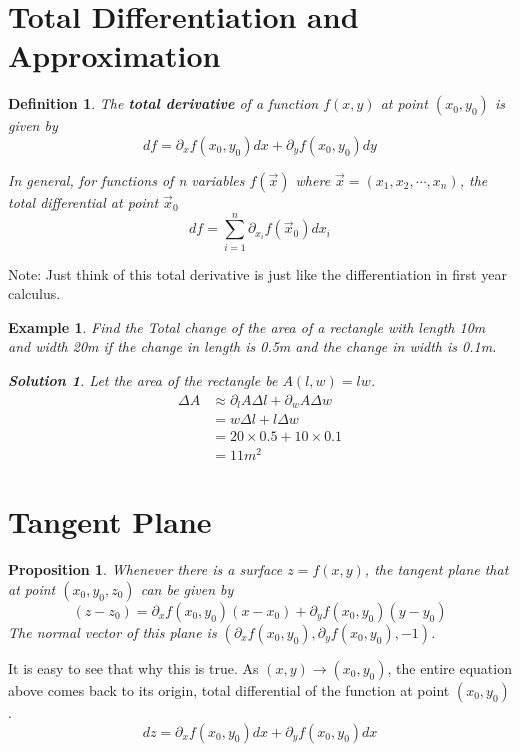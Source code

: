 \documentclass{article}
\newtheorem{definition}{Definition}
\newtheorem{ex}{Example}
\newtheorem{prop}{Proposition}
\newtheorem*{solution}{Solution}
\begin{document}
\section{Total Differentiation and Approximation}
\begin{definition}
	The \textbf{total derivative} of a function $f(x,y)$ at point $(x_0,y_0)$ is given by
	\[ df = \partial_x f(x_0,y_0) dx + \partial_y f(x_0,y_0) dy \]
	
	In general, for functions of n variables $f(\vec{x})$ where $\vec{x}=(x_1,x_2,\cdots,x_n)$, the total differential at point $\vec{x}_0$
	\[ df = \sum_{i=1}^n \partial_{x_i} f(\vec{x}_0) dx_i \]
\end{definition}

Note: Just think of this total derivative is just like the differentiation in first year calculus.

\begin{ex}
	Find the Total change of the area of a rectangle with length 10m and width 20m if the change in length is 0.5m and the change in width is 0.1m.
	\begin{solution}
		Let the area of the rectangle be $A(l,w) = lw$.
		\begin{align*}
		\Delta A &\approx \partial_l A\Delta l + \partial_w A \Delta w\\
		&= w\Delta l + l\Delta w\\
		&= 20\times 0.5 + 10\times 0.1\\
		&= 11 m^2 
		\end{align*}  
	\end{solution}  
\end{ex}

\section{Tangent Plane}
\begin{prop}
	Whenever there is a surface $z=f(x,y)$, the tangent plane that at point $(x_0,y_0,z_0)$ can be given by
\[ (z-z_0) = \partial_xf(x_0,y_0)(x-x_0) + \partial_yf(x_0,y_0)(y-y_0) \]
The normal vector of this plane is $(\partial_xf(x_0,y_0),\partial_yf(x_0,y_0),-1)$.
\end{prop}

It is easy to see that why this is true. As $(x,y)\to (x_0,y_0)$, the entire equation above comes back to its origin, total differential of the function at point $(x_0,y_0)$.
\[ dz =  \partial_xf(x_0,y_0)dx+ \partial_yf(x_0,y_0)dx \] 
\end{document}

